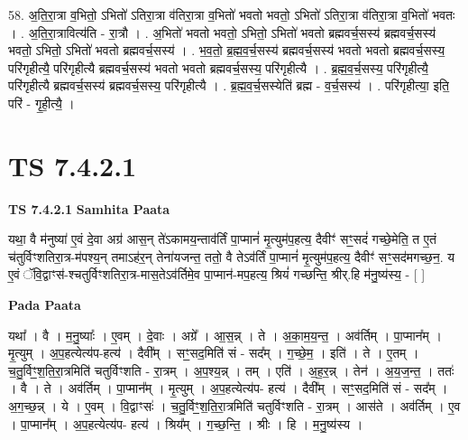 \documentclass[17pt]{extarticle}
\begin{document}
58. अ॒ति॒रा॒त्रा व॒भितो॒ ऽभितो॑ ऽतिरा॒त्रा व॑तिरा॒त्रा व॒भितो॑ भवतो भवतो॒ ऽभितो॑ ऽतिरा॒त्रा व॑तिरा॒त्रा व॒भितो॑ भवतः । . अ॒ति॒रा॒त्रावित्य॑ति - रा॒त्रौ । . अ॒भितो॑ भवतो भवतो॒ ऽभितो॒ ऽभितो॑ भवतो ब्रह्मवर्च॒सस्य॑ ब्रह्मवर्च॒सस्य॑ भवतो॒ ऽभितो॒ ऽभितो॑ भवतो ब्रह्मवर्च॒सस्य॑ । . भ॒व॒तो॒ ब्र॒ह्म॒व॒र्च॒सस्य॑ ब्रह्मवर्च॒सस्य॑ भवतो भवतो ब्रह्मवर्च॒सस्य॒ परि॑गृहीत्यै॒ परि॑गृहीत्यै ब्रह्मवर्च॒सस्य॑ भवतो भवतो ब्रह्मवर्च॒सस्य॒ परि॑गृहीत्यै । . ब्र॒ह्म॒व॒र्च॒सस्य॒ परि॑गृहीत्यै॒ परि॑गृहीत्यै ब्रह्मवर्च॒सस्य॑ ब्रह्मवर्च॒सस्य॒ परि॑गृहीत्यै । . ब्र॒ह्म॒व॒र्च॒सस्येति॑ ब्रह्म - व॒र्च॒सस्य॑ । . परि॑गृहीत्या॒ इति॒ परि॑ - गृ॒ही॒त्यै॒ । \newline
\pagebreak
{}

\section{ TS 7.4.2.1 }

\textbf{TS 7.4.2.1 } \newline
\textbf{Samhita Paata} \newline

यथा॒ वै म॑नुष्या॑ ए॒वं दे॒वा अग्र॑ आस॒न् ते॑ऽकामय॒न्ताव॑र्तिं पा॒प्मानं॑ मृ॒त्युम॑प॒हत्य॒ दैवीꣳ॑ सꣳ॒॒सदं॑ गच्छे॒मेति॒ त ए॒तं च॑तुर्विꣳशतिरा॒त्र-म॑पश्य॒न् तमाऽह॑र॒न् तेना॑यजन्त॒ ततो॒ वै तेऽव॑र्तिं पा॒प्मानं॑ मृ॒त्युम॑प॒हत्य॒ दैवीꣳ॑ सꣳ॒॒सद॑मगच्छ॒न॒. य ए॒वं ॅवि॒द्वाꣳस॑-श्चतुर्विꣳशतिरा॒त्र-मास॒तेऽव॑र्तिमे॒व पा॒प्मान॑-मप॒हत्य॒ श्रियं॑ गच्छन्ति॒ श्रीर्.हि म॑नु॒ष्य॑स्य॒ - [  ] \newline

\textbf{Pada Paata} \newline

यथा᳚ । वै । म॒नु॒ष्याः᳚ । ए॒वम् । दे॒वाः । अग्रे᳚ । आ॒स॒न्न् । ते । अ॒का॒म॒य॒न्त॒ । अव॑र्तिम् । पा॒प्मान᳚म् । मृ॒त्युम् । अ॒प॒हत्येत्य॑प-हत्य॑ । दैवी᳚म् । सꣳ॒॒सद॒मिति॑ सं - सद᳚म् । ग॒च्छे॒म॒ । इति॑ । ते । ए॒तम् । च॒तु॒र्विꣳ॒॒श॒ति॒रा॒त्रमिति॑ चतुर्विꣳशति - रा॒त्रम् । अ॒प॒श्य॒न्न् । तम् । एति॑ । अ॒ह॒र॒न्न् । तेन॑ । अ॒य॒ज॒न्त॒ । ततः॑ । वै । ते । अव॑र्तिम् । पा॒प्मान᳚म् । मृ॒त्युम् । अ॒प॒हत्येत्य॑प- हत्य॑ । दैवी᳚म् । सꣳ॒॒सद॒मिति॑ सं - सद᳚म् । अ॒ग॒च्छ॒न्न् । ये । ए॒वम् । वि॒द्वाꣳसः॑ । च॒तु॒र्विꣳ॒॒श॒ति॒रा॒त्रमिति॑ चतुर्विꣳशति - रा॒त्रम् । आस॑ते । अव॑र्तिम् । ए॒व । पा॒प्मान᳚म् । अ॒प॒हत्येत्य॑प- हत्य॑ । श्रिय᳚म् । ग॒च्छ॒न्ति॒ । श्रीः । हि । म॒नु॒ष्य॑स्य ।  \newline
\end{document}
